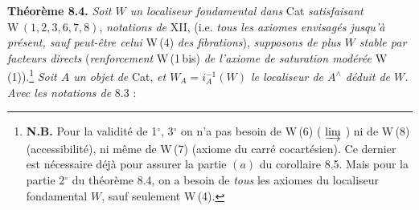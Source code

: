 \documentclass[11pt]{article}
\newcommand{\printedpage}[1]{\marginpar{\raggedright\footnotesize p.~#1}}
\newcommand{\msp}[1]{\marginpar{\raggedright\footnotesize [#1]}}
\newcommand{\chap}{^{\wedge}}
\begin{document}
\printedpage{58}
\msp{page 105}
\textbf{Théorème 8.4.} \textit{Soit $W$ un localiseur fondamental dans} Cat \textit{satisfaisant} $\mathrm{W}\,(1,2,3,6,7,8)$, \textit{notations de} XII, (i.e. \textit{tous les axiomes envisagés jusqu'à présent, sauf peut-être celui} W\,(4) \textit{des fibrations}), \textit{supposons de plus $W$ stable par facteurs directs} (\textit{renforcement} W\,(1\,bis) \textit{de l'axiome de saturation modérée} W\,(1)).\footnote[37]{\textbf{N.B.} Pour la validité de 1$^\circ$, 3$^\circ$ on n'a pas besoin de W\,(6) ( $\varinjlim$ ) ni de W\,(8) (accessibilité), ni même de W\,(7) (axiome du carré cocartésien). Ce dernier est nécessaire déjà pour assurer la partie $(a)$ du corollaire 8.5. Mais pour la partie 2$^\circ$ du théorème 8.4, on a besoin de \textit{tous} les axiomes du localiseur fondamental $W$, sauf seulement W\,(4).} \textit{Soit $A$ un objet de} Cat, \textit{et $W_A=i_A^{-1}(W)$ le localiseur de $A\chap$ déduit de $W$. Avec les notations de} 8.3 :
\end{document}
